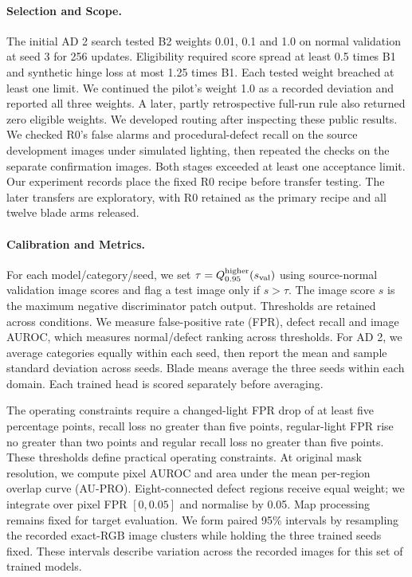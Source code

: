 \documentclass[letterpaper]{article}
\begin{document}
\paragraph{Selection and Scope.}
The initial AD 2 search tested B2 weights 0.01, 0.1 and 1.0 on normal validation at seed 3
for 256 updates. Eligibility required score spread at least 0.5 times B1 and synthetic hinge
loss at most 1.25 times B1. Each tested weight breached at least one limit. We continued the
pilot's weight 1.0 as a recorded deviation and reported all three weights. A later, partly
retrospective full-run rule also returned zero eligible weights. We developed routing after
inspecting these public results. We checked R0's false alarms and procedural-defect recall
on the source development images under simulated lighting, then repeated the checks on the
separate confirmation images. Both stages exceeded at least one acceptance limit. Our
experiment records place the fixed R0 recipe before transfer testing. The later transfers
are exploratory, with R0 retained as the primary recipe and all twelve blade arms released.

\paragraph{Calibration and Metrics.}
For each model/category/seed, we set $\tau=Q_{0.95}^{\rm higher}(s_{\rm val})$ using
source-normal validation image scores and flag a test image only if $s>\tau$. The image
score $s$ is the maximum negative discriminator patch output. Thresholds are retained across
conditions. We measure false-positive rate (FPR), defect recall and image AUROC, which
measures normal/defect ranking across thresholds. For AD 2, we average categories equally
within each seed, then report the mean and sample standard deviation across seeds. Blade
means average the three seeds within each domain. Each trained head is scored separately
before averaging.

The operating constraints require a changed-light FPR drop of at least five percentage
points, recall loss no greater than five points, regular-light FPR rise no greater than two
points and regular recall loss no greater than five points. These thresholds define
practical operating constraints. At original mask resolution, we compute pixel AUROC and
area under the mean per-region overlap curve (AU-PRO). Eight-connected defect regions
receive equal weight; we integrate over pixel FPR $[0,0.05]$ and normalise by 0.05. Map
processing remains fixed for target evaluation. We form paired 95\% intervals by resampling
the recorded exact-RGB image clusters while holding the three trained seeds fixed. These
intervals describe variation across the recorded images for this set of trained models.
\end{document}
